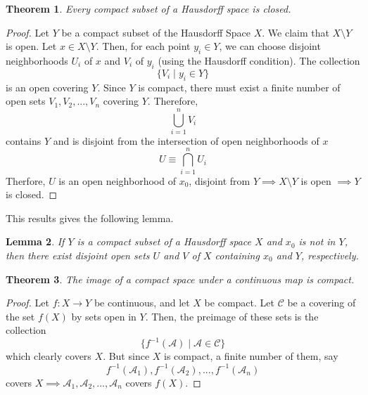 \documentclass{article}
\newtheorem{theorem}{Theorem}[section]
\newtheorem{lemma}[theorem]{Lemma}
\theoremstyle{remark}
\theoremstyle{definition}
\begin{document}
\begin{theorem}
Every compact subset of a Hausdorff space is closed. 
\end{theorem}
\begin{proof}
Let $Y$ be a compact subset of the Hausdorff Space $X$. We claim that $X \setminus Y$ is open. Let $x \in X \setminus Y$. Then, for each point $y_i \in Y$, we can choose disjoint neighborhoods $U_i$ of $x$ and $V_i$ of $y_i$ (using the Hausdorff condition). The collection 
\[\{V_i \; | \; y_i \in Y\}\]
is an open covering $Y$. Since $Y$ is compact, there must exist a finite number of open sets $V_1, V_2, ..., V_n$ covering $Y$. Therefore, 
\[\bigcup_{i=1}^n V_i\]
contains $Y$ and is disjoint from the intersection of open neighborhoods of $x$
\[U \equiv \bigcap_{i=1}^n U_i\]
Therfore, $U$ is an open neighborhood of $x_0$, disjoint from $Y \implies X \setminus Y$ is open $\implies Y$ is closed.
\end{proof}

This results gives the following lemma. 

\begin{lemma}
If $Y$ is a compact subset of a Hausdorff space $X$ and $x_0$ is not in $Y$, then there exist disjoint open sets $U$ and $V$ of $X$ containing $x_0$ and $Y$, respectively. 
\end{lemma}

\begin{center}
\end{center}

\begin{theorem}
The image of a compact space under a continuous map is compact.
\end{theorem}
\begin{proof}
Let $f: X \longrightarrow Y$ be continuous, and let $X$ be compact. Let $\mathcal{C}$ be a covering of the set $f(X)$ by sets open in $Y$. Then, the preimage of these sets is the collection
\[\{f^{-1}(\mathcal{A}) \; | \; \mathcal{A} \in \mathcal{C}\}\]
which clearly covers $X$. But since $X$ is compact, a finite number of them, say
\[f^{-1} (\mathcal{A}_1), f^{-1} (\mathcal{A}_2), ..., f^{-1} (\mathcal{A}_n)\]
covers $X \implies \mathcal{A}_1, \mathcal{A}_2, ..., \mathcal{A}_n$ covers $f(X)$. 
\end{proof}
\end{document}

